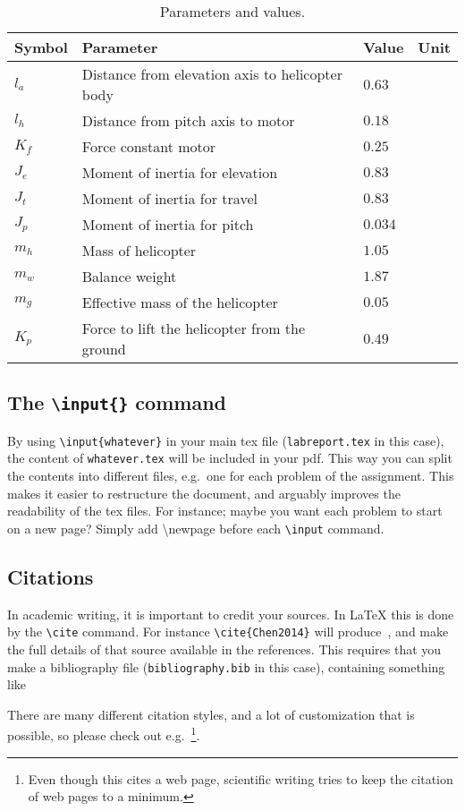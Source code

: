 \begin{table}[tbp]
	\centering
	\caption{Parameters and values.}
	\begin{tabular}{llll}
		\toprule
		Symbol & Parameter & Value & Unit \\
		\midrule
		$l_a$ & Distance from elevation axis to helicopter body & $0.63$ & \meter\\
		$l_h$ & Distance from pitch axis to motor & $0.18$ & \meter\\
		$K_f$ & Force constant motor & $0.25$ & \newton\per\volt\\
		$J_e$ & Moment of inertia for elevation & $0.83$ & \kilogram\usk\meter\squared\\
		$J_t$ & Moment of inertia for travel & $0.83$ & \kilogram\usk\meter\squared\\
		$J_p$ & Moment of inertia for pitch & $0.034$ & \kilogram\usk\meter\squared\\
		$m_h$ & Mass of helicopter & $1.05$ & \kilogram\\
		$m_w$ & Balance weight & $1.87$ & \kilogram\\
		$m_g$ & Effective mass of the helicopter & $0.05$ & \kilogram\\
		$K_p$ & Force to lift the helicopter from the ground & $0.49$ & \newton\\
		\bottomrule
	\end{tabular}
\label{tab:parameters}
\end{table}


\subsection{The \texttt{\textbackslash{input}\{\}} command}
By using \texttt{\textbackslash{input}\{whatever\}} in your main tex file (\texttt{labreport.tex} in this case), the content of \texttt{whatever.tex} will be included in your pdf. This way you can split the contents into different files, e.g.~one for each problem of the assignment. This makes it easier to restructure the document, and arguably improves the readability of the tex files. For instance; maybe you want each problem to start on a new page? Simply add \textbackslash{newpage} before each \texttt{\textbackslash{input}} command.

\subsection{Citations}
In academic writing, it is important to credit your sources. In \LaTeX{} this is done by the \texttt{\textbackslash{cite}} command. For instance \texttt{\textbackslash{cite}\{Chen2014\}} will produce~\cite{Chen2014}, and make the full details of that source available in the references. This requires that you make a bibliography file (\texttt{bibliography.bib} in this case), containing something like


There are many different citation styles, and a lot of customization that is possible, so please check out e.g.~\cite{WikibookLatex}\footnote{Even though this cites a web page, scientific writing tries to keep the citation of web pages to a minimum.}.

